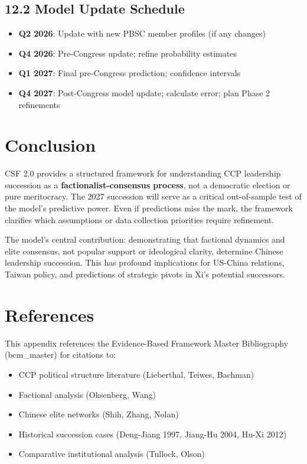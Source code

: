 \documentclass[11pt]{article}
\begin{document}
\subsection{12.2 Model Update Schedule}

\begin{itemize}
\item \textbf{Q2 2026}: Update with new PBSC member profiles (if any changes)
\item \textbf{Q4 2026}: Pre-Congress update; refine probability estimates
\item \textbf{Q1 2027}: Final pre-Congress prediction; confidence intervals
\item \textbf{Q4 2027}: Post-Congress model update; calculate error; plan Phase 2 refinements
\end{itemize}

\section{Conclusion}

CSF 2.0 provides a structured framework for understanding CCP leadership succession as a \textbf{factionalist-consensus process}, not a democratic election or pure meritocracy. The 2027 succession will serve as a critical out-of-sample test of the model's predictive power. Even if predictions miss the mark, the framework clarifies which assumptions or data collection priorities require refinement.

The model's central contribution: demonstrating that factional dynamics and elite consensus, not popular support or ideological clarity, determine Chinese leadership succession. This has profound implications for US-China relations, Taiwan policy, and predictions of strategic pivots in Xi's potential successors.

\section*{References}

\nocite{bcm_master}

This appendix references the Evidence-Based Framework Master Bibliography (bcm\_master) for citations to:
\begin{itemize}
\item CCP political structure literature (Lieberthal, Teiwes, Bachman)
\item Factional analysis (Oksenberg, Wang)
\item Chinese elite networks (Shih, Zhang, Nolan)
\item Historical succession cases (Deng-Jiang 1997, Jiang-Hu 2004, Hu-Xi 2012)
\item Comparative institutional analysis (Tullock, Olson)
\end{itemize}
\end{document}
